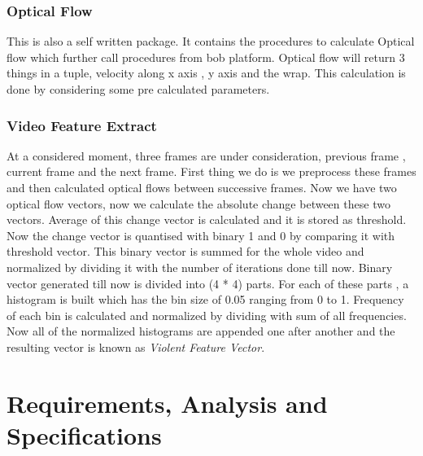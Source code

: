 \subsubsection{Optical Flow}
This is also a self written package. It contains the procedures to calculate Optical flow which further call procedures from bob platform. Optical flow will return 3 things in a tuple, velocity along x axis , y axis and the wrap. This calculation is done by considering some pre calculated parameters.
\subsubsection{Video Feature Extract}
At a considered moment, three frames are under consideration, previous frame , current frame and the next frame. First thing we do is we preprocess these frames and then calculated optical flows between successive frames. Now we have two optical flow vectors, now we calculate the absolute change between these two vectors. Average of this change vector is calculated and it is stored as threshold. Now the change vector is quantised with binary 1 and 0 by comparing it with threshold vector. This binary vector is summed for the whole video and normalized by dividing it with the number of iterations done till now. Binary vector generated till now is divided into (4 * 4) parts. For each of these parts , a histogram is built which has the bin size of 0.05 ranging from 0 to 1. Frequency of each bin is calculated and normalized by dividing with sum of all frequencies. Now all of the normalized histograms are appended one after another and the resulting vector is known as \textit{Violent Feature Vector}.



\section{Requirements, Analysis and Specifications}
